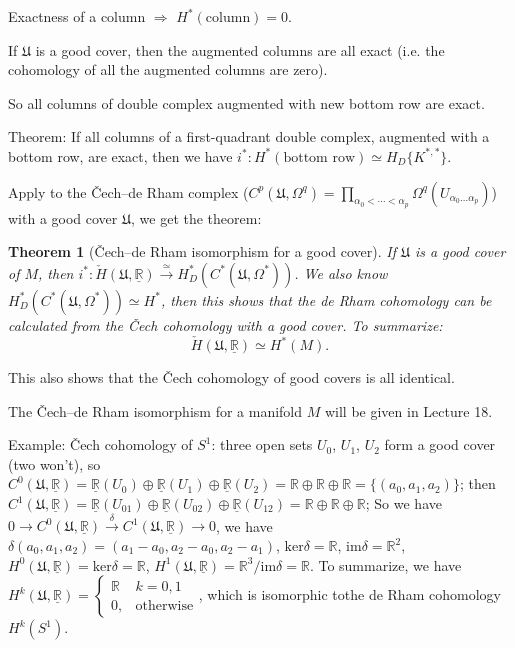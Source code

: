 \documentclass{article}
\theoremstyle{mystyle}
\newtheorem*{theorem*}{Theorem}
\theoremstyle{remark}
\numberwithin{equation}{section}
\begin{document}
Exactness of a column $\Rightarrow$ $H^*(\text{column})=0$.

If $\mathfrak{U}$ is a good cover, then the augmented columns are all exact (i.e. the cohomology of all the augmented columns are zero). 

So all columns of double complex augmented with new bottom row are exact.

Theorem: If all columns of a first-quadrant double complex, augmented with a bottom row, are exact, then we have $i^*\colon H^*(\text{bottom row}) \simeq H_D\{K^{*,*}\}$. 



Apply to the Čech--de Rham complex ($C^p(\mathfrak{U},\Omega^q) = \prod_{\alpha_0<\cdots< \alpha_p}
\Omega^q(U_{\alpha_0...\alpha_p})$) with a good cover $\mathfrak{U}$, we get the theorem:

\begin{theorem*}[Čech--de Rham isomorphism for a good cover]
If $\mathfrak{U}$ is a good cover of $M$, then $i^*\colon \check{H}(\mathfrak{U},\underline{\mathbb{R}})\xrightarrow{\simeq}
H_D^*(C^*(\mathfrak{U},\Omega^*))$.
We also know $H_D^*(C^*(\mathfrak{U},\Omega^*))\simeq H^*$, then this shows that the de Rham cohomology can be calculated from the Čech cohomology with a good cover. To summarize:
$$\check{H}(\mathfrak{U},\underline{\mathbb{R}}) \simeq H^*(M).$$
\end{theorem*}
This also shows that the Čech cohomology of good covers is all identical.

The Čech--de Rham isomorphism for a manifold $M$ will be given in Lecture 18.

Example: Čech cohomology of $S^1$: three open sets $U_0$, $U_1$, $U_2$ form a good cover (two won't), so $C^0(\mathfrak{U},\underline{\mathbb{R}}) = \underline{\mathbb{R}}(U_0)\oplus 
\underline{\mathbb{R}}(U_1)\oplus
\underline{\mathbb{R}}(U_2) = \mathbb{R}\oplus\mathbb{R}\oplus \mathbb{R} = \{(a_0,a_1,a_2)\}$; then  $C^1(\mathfrak{U},\underline{\mathbb{R}})
=\underline{\mathbb{R}}(U_{01})\oplus \underline{\mathbb{R}}(U_{02})\oplus
\underline{\mathbb{R}}(U_{12})
=\mathbb{R}\oplus\mathbb{R}\oplus \mathbb{R}$;
So we have 
$0\rightarrow C^0(\mathfrak{U},\underline{\mathbb{R}})\xrightarrow{\delta}
C^1(\mathfrak{U},\underline{\mathbb{R}})\rightarrow 0$, we have 
$\delta(a_0,a_1,a_2) = (a_1-a_0,a_2-a_0,a_2-a_1)$, $\mathrm{ker}\delta = \mathbb{R}$, $\mathrm{im}\delta = \mathbb{R}^2$, $H^0(\mathfrak{U},\underline{\mathbb{R}}) = \mathrm{ker}\delta = \mathbb{R}$, $H^1(\mathfrak{U},\underline{\mathbb{R}}) = \mathbb{R}^3/\mathrm{im}\delta = \mathbb{R}$. To summarize, we have $H^k(\mathfrak{U},\underline{\mathbb{R}}) = \left\{\begin{array}{ll} \mathbb{R} & k=0,1\\0, &\text{otherwise}\end{array}\right.$, which is isomorphic tothe de Rham cohomology $H^k(S^1)$.
\end{document}
